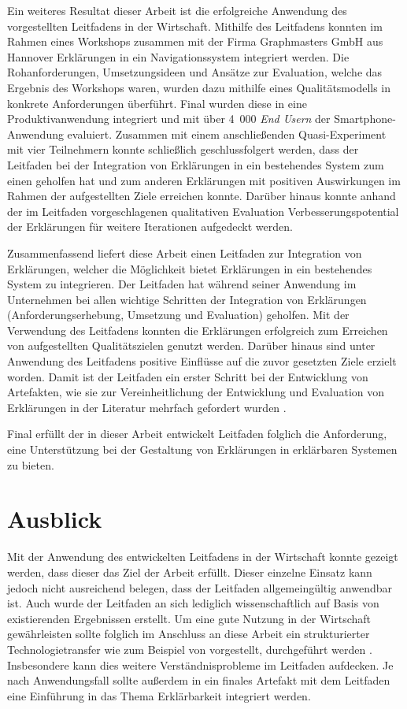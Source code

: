 Ein weiteres Resultat dieser Arbeit ist die erfolgreiche Anwendung des vorgestellten Leitfadens in der Wirtschaft. Mithilfe des Leitfadens konnten im Rahmen eines Workshops zusammen mit der Firma Graphmasters GmbH aus Hannover Erklärungen in ein Navigationssystem integriert werden. Die Rohanforderungen, Umsetzungsideen und Ansätze zur Evaluation, welche das Ergebnis des Workshops waren, wurden dazu mithilfe eines Qualitätsmodells in konkrete Anforderungen überführt. Final wurden diese in eine Produktivanwendung integriert und mit über 4~000 \textit{End Usern} der Smartphone-Anwendung evaluiert. Zusammen mit einem anschließenden Quasi-Experiment mit vier Teilnehmern konnte schließlich geschlussfolgert werden, dass der Leitfaden bei der Integration von Erklärungen in ein bestehendes System zum einen geholfen hat und zum anderen Erklärungen mit positiven Auswirkungen im Rahmen der aufgestellten Ziele erreichen konnte. Darüber hinaus konnte anhand der im Leitfaden vorgeschlagenen qualitativen Evaluation Verbesserungspotential der Erklärungen für weitere Iterationen aufgedeckt werden.

\newpage

Zusammenfassend liefert diese Arbeit einen Leitfaden zur Integration von Erklärungen, welcher die Möglichkeit bietet Erklärungen in ein bestehendes System zu integrieren. Der Leitfaden hat während seiner Anwendung im Unternehmen bei allen wichtige Schritten der Integration von Erklärungen (Anforderungserhebung, Umsetzung und Evaluation) geholfen. Mit der Verwendung des Leitfadens konnten die Erklärungen erfolgreich zum Erreichen von aufgestellten Qualitätszielen genutzt werden. Darüber hinaus sind unter Anwendung des Leitfadens positive Einflüsse auf die zuvor gesetzten Ziele erzielt worden. Damit ist der Leitfaden ein erster Schritt bei der Entwicklung von Artefakten, wie sie zur Vereinheitlichung der Entwicklung und Evaluation von Erklärungen in der Literatur mehrfach gefordert wurden \cite{kohl_explainability_2019,lim_2009_assessing,sokol_explainability_2020}.

Final erfüllt der in dieser Arbeit entwickelt Leitfaden folglich die Anforderung, eine Unterstützung bei der Gestaltung von Erklärungen in erklärbaren Systemen zu bieten.

\section{Ausblick}

Mit der Anwendung des entwickelten Leitfadens in der Wirtschaft konnte gezeigt werden, dass dieser das Ziel der Arbeit erfüllt. Dieser einzelne Einsatz kann jedoch nicht ausreichend belegen, dass der Leitfaden allgemeingültig anwendbar ist. Auch wurde der Leitfaden an sich lediglich wissenschaftlich auf Basis von existierenden Ergebnissen erstellt. Um eine gute Nutzung in der Wirtschaft gewährleisten sollte folglich im Anschluss an diese Arbeit ein strukturierter Technologietransfer wie zum Beispiel von \citeauthor{4012630} vorgestellt, durchgeführt werden \cite{4012630}. Insbesondere kann dies weitere Verständnisprobleme im Leitfaden aufdecken. Je nach Anwendungsfall sollte außerdem in ein finales Artefakt mit dem Leitfaden eine Einführung in das Thema Erklärbarkeit integriert werden.

